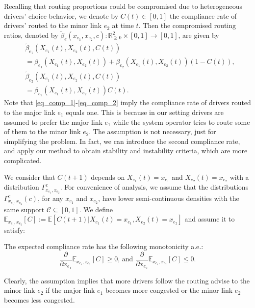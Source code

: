 Recalling that routing proportions could be compromised due to heterogeneous drivers' choice behavior, we denote by $C(t)\in[0, 1]$ the compliance rate of drivers' routed to the minor link $e_2$ at time $t$. Then the compromised routing ratios, denoted by $\tilde{\beta}_e(x_{e_1},x_{e_2},c):\mathbb{R}^2_{\geq0}\times[0, 1]\to[0,1]$, are given by
\begin{subequations}
    \begin{align}
        &\tilde{\beta}_{e_1}(X_{e_1}(t), X_{e_2}(t), C(t)) \nonumber \\
        &=\beta_{e_1}(X_{e_1}(t), X_{e_2}(t)) + \beta_{e_2}(X_{e_1}(t), X_{e_2}(t))(1-C(t)), \label{eq_comp_1} \\
        &\tilde{\beta}_{e_2}(X_{e_1}(t),X_{e_2}(t), C(t)) \nonumber \\
        &= \beta_{e_2}(X_{e_1}(t), X_{e_2}(t))C(t). \label{eq_comp_2}
    \end{align}
\end{subequations}
Note that \eqref{eq_comp_1}-\eqref{eq_comp_2} imply the compliance rate of drivers routed to the major link $e_1$ equals one. This is because in our setting drivers are assumed to prefer the major link $e_1$ while the system operator tries to route some of them to the minor link $e_2$. The assumption is not necessary, just for simplifying the problem. In fact, we can introduce the second compliance rate, and apply our method to obtain stability and instability criteria, which are more complicated.

We consider that $C(t+1)$ depends on $X_{e_1}(t)=x_{e_1}$ and $X_{e_2}(t)=x_{e_2}$ with a distribution $\Gamma^c_{x_{e_1},x_{e_2}}$. For convenience of analysis, we assume that the distributions $\Gamma^c_{x_{e_1},x_{e_2}}(c)$, for any $x_{e_1}$ and $x_{e_2}$, have lower semi-continuous densities with the same support $\mathcal{C}\subseteq [0,1]$. We define $\mathbb{E}_{x_{e_1},x_{e_2}}[C]:=\mathbb{E}[C(t+1)|X_{e_1}(t)=x_{e_1},X_{e_2}(t)=x_{e_2}]$ and assume it to satisfy:
\begin{asm} The expected compliance rate has the following monotonicity a.e.:
\begin{equation}
    \frac{\partial}{\partial x_{e_1}} \mathbb{E}_{x_{e_1},x_{e_2}}[C] \geq0\text{, and } \frac{\partial}{\partial x_{e_2}} \mathbb{E}_{x_{e_1},x_{e_2}}[C] \leq0. 
\end{equation}
\end{asm}

Clearly, the assumption implies that more drivers follow the routing advise to the minor link $e_2$ if the major link $e_1$ becomes more congested or the minor link $e_2$ becomes less congested.

